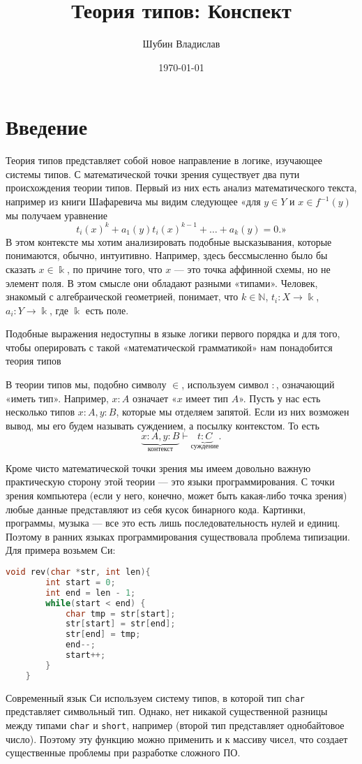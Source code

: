 \documentclass[openany]{book}
\date{\today}
\author{Шубин Владислав}
\title{Теория типов: Конспект}
\theoremstyle{plain}
\theoremstyle{definition}
\newcommand{\N}{\mathbb{N}}
\begin{document}
\maketitle
\tableofcontents

\chapter{Введение}
Теория типов представляет собой новое направление в логике, изучающее системы типов. С математической точки зрения существует два пути происхождения теории типов. Первый из них есть анализ математического текста, например из книги Шафаревича \cite{Shaph} мы видим следующее «для \(y \in Y\) и \(x \in f^{-1}(y)\) мы получаем уравнение \[t_i(x)^k + a_1(y)t_i(x)^{k-1}+\dots+a_k(y) = 0.\text{»}\]В этом контексте мы хотим анализировать подобные высказывания, которые понимаются, обычно, интуитивно. Например, здесь бессмысленно было бы сказать \(x \in \Bbbk\), по причине того, что \(x\) --- это точка аффинной схемы, но не элемент поля. В этом смысле они обладают разными «типами». Человек, знакомый с алгебраической геометрией, понимает, что \(k \in \N\), \(t_i : X \to \Bbbk\), \(a_i : Y \to \Bbbk\), где \(\Bbbk\) есть поле.

Подобные выражения недоступны в языке логики первого порядка и для того, чтобы оперировать с такой «математической грамматикой» нам понадобится теория типов

В теории типов мы, подобно символу \(\in\), используем символ \(:\), означающий «иметь тип». Например, \(x : A\) означает «\(x\) имеет тип \(A\)». Пусть у нас есть несколько типов \(x : A, y : B\), которые мы отделяем запятой. Если из них возможен вывод, мы его будем называть суждением, а посылку контекстом. То есть \[\underbrace{x : A, y : B}_{\text{контекст}} \vdash \underbrace{t : C}_{\text{суждение}}.\]

Кроме чисто математической точки зрения мы имеем довольно важную практическую сторону этой теории --- это языки программирования. С точки зрения компьютера (если у него, конечно, может быть какая-либо точка зрения) любые данные представляют из себя кусок бинарного кода. Картинки, программы, музыка --- все это есть лишь последовательность нулей и единиц. Поэтому в ранних языках программирования существовала проблема типизации. Для примера возьмем Си:
\begin{lstlisting}[language=C]
    void rev(char *str, int len){
        int start = 0;
        int end = len - 1;
        while(start < end) {
            char tmp = str[start];
            str[start] = str[end];
            str[end] = tmp;
            end--;
            start++;
        }
    }
\end{lstlisting}
Современный язык Си используем систему типов, в которой тип \texttt{char} представляет символьный тип. Однако, нет никакой существенной разницы между типами \texttt{char} и \texttt{short}, например (второй тип представляет однобайтовое число). Поэтому эту функцию можно применить и к массиву чисел, что создает существенные проблемы при разработке сложного ПО.
\end{document}
